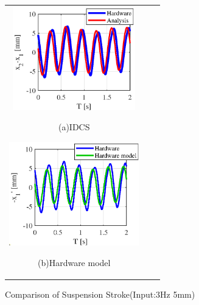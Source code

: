 \documentclass[a4paper,12pt]{article_vdlab_sotsuron}
\begin{document}
\vspace{5mm}
\begin{figure}[h]
  \begin{tabular}{ccc}
  \begin{minipage}{0.33\hsize}
  \begin{center}
    \includegraphics[height=45mm]{figure/hils_nonlinear_sus_5_3.eps}
    \end{center}
    \begin{center}
    \ (a)IDCS\
    \end{center}
  \end{minipage}
  \begin{minipage}{0.33\hsize}
     \begin{center}
      \includegraphics[height=45mm]{figure/hils_nonlinear_idcs_5_3.eps}
      \end{center}
      \begin{center}
      \ (b)Hardware model\
    \end{center}
  \end{minipage}
  \end{tabular}
\vspace*{2mm}
  \caption{Comparison of Suspension Stroke(Input:3Hz 5mm)}
    \label{fig:hils_5_3_nonlinear}
\end{figure}
\end{document}
